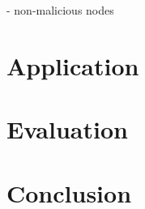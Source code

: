 \documentclass[10pt,journal,compsoc]{IEEEtran}
\begin{document}
- non-malicious nodes

\section{Application}
\label{sec.app}

\section{Evaluation}
\label{sec.eval}

\section{Conclusion}
\label{sec.conclusion}

\end{document}
